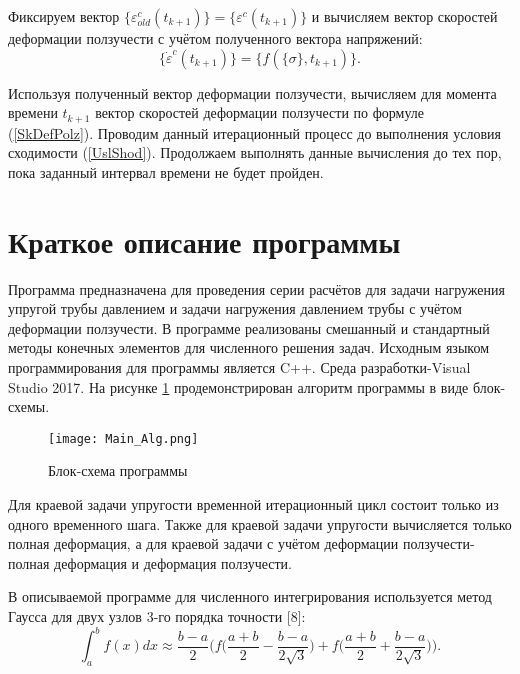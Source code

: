 \documentclass[a4paper,14pt]{extarticle}
\begin{document}
Фиксируем вектор $\{\varepsilon^{c}_{old}(t_{k+1})\}=\{\varepsilon^{c}(t_{k+1})\}$ и вычисляем вектор скоростей деформации ползучести с учётом полученного вектора напряжений:
\begin{equation}
\{\dot{\varepsilon}^{c}(t_{k+1})\}=\{f(\{\sigma\},t_{k+1})\}.
\end{equation}

Используя полученный вектор деформации ползучести, вычисляем для момента времени $t_{k+1}$ вектор скоростей деформации ползучести по формуле (\ref{SkDefPolz}). Проводим данный итерационный процесс до выполнения условия сходимости (\ref{UslShod}). Продолжаем выполнять данные вычисления до тех пор, пока заданный интервал времени не будет пройден.

\newpage

\section{Краткое описание программы}

Программа предназначена для проведения серии расчётов для задачи нагружения упругой трубы давлением и задачи нагружения давлением трубы с учётом деформации ползучести. В программе реализованы смешанный и стандартный методы конечных элементов для численного решения задач. Исходным языком программирования для программы является C++. Среда разработки-Visual Studio 2017. На рисунке \ref{BlockSch} продемонстрирован алгоритм программы в виде блок-схемы. 
\bigskip
\begin{figure}[h]	
\begin{center}
\texttt{[image: Main\_Alg.png]}
\caption{Блок-схема программы}
\label{BlockSch}
\end{center}
\end{figure}

\newpage


Для краевой задачи упругости временной итерационный цикл состоит только из одного временного шага. Также для краевой задачи упругости вычисляется только полная деформация, а для краевой задачи с учётом деформации ползучести-полная деформация и деформация ползучести.

В описываемой программе для численного интегрирования используется метод Гаусса для двух узлов 3-го порядка точности [8]:
\begin{equation*}
\int_a^b f(x)dx \approx  \frac{b-a}{2} \bigg(f\Big(\frac{a+b}{2}-\frac{b-a}{2\sqrt{3}}\Big)+f\Big(\frac{a+b}{2}+\frac{b-a}{2\sqrt{3}}\Big)\bigg).
\end{equation*}
\end{document}
